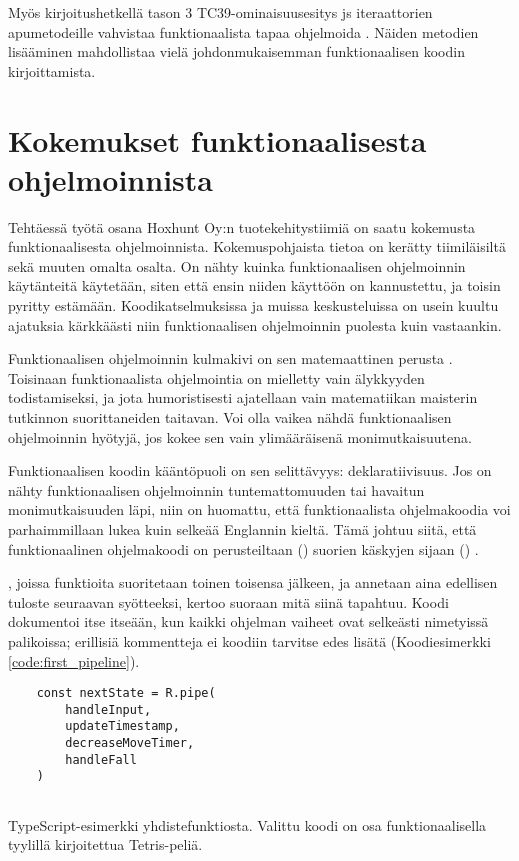 Myös kirjoitushetkellä tason 3 TC39-ominaisuusesitys \gls{js} iteraattorien apumetodeille vahvistaa funktionaalista tapaa ohjelmoida \cite{tc39_iterator_helpers}. Näiden metodien lisääminen mahdollistaa vielä johdonmukaisemman funktionaalisen koodin kirjoittamista.

\section{Kokemukset funktionaalisesta ohjelmoinnista}


Tehtäessä työtä osana Hoxhunt Oy:n tuotekehitystiimiä on saatu kokemusta funktionaalisesta ohjelmoinnista. Kokemuspohjaista tietoa on kerätty tiimiläisiltä sekä muuten omalta osalta. On nähty kuinka funktionaalisen ohjelmoinnin käytänteitä käytetään, siten että ensin niiden käyttöön on kannustettu, ja toisin pyritty estämään. Koodikatselmuksissa ja muissa keskusteluissa on usein kuultu ajatuksia kärkkäästi niin funktionaalisen ohjelmoinnin puolesta kuin vastaankin.

Funktionaalisen ohjelmoinnin kulmakivi on sen matemaattinen perusta \cite{computerphile_lambda,Tan2004}. Toisinaan funktionaalista ohjelmointia on mielletty vain älykkyyden todistamiseksi, ja jota humoristisesti ajatellaan vain matematiikan maisterin tutkinnon suorittaneiden taitavan. Voi olla vaikea nähdä funktionaalisen ohjelmoinnin hyötyjä, jos kokee sen vain ylimääräisenä monimutkaisuutena.

Funktionaalisen koodin kääntöpuoli on sen selittävyys: deklaratiivisuus. Jos on nähty funktionaalisen ohjelmoinnin tuntemattomuuden tai havaitun monimutkaisuuden läpi, niin on huomattu, että funktionaalista ohjelmakoodia voi parhaimmillaan lukea kuin selkeää Englannin kieltä. Tämä johtuu siitä, että funktionaalinen ohjelmakoodi on perusteiltaan () suorien käskyjen sijaan () \cite{ms:fp_vs_imperative}.

, joissa funktioita suoritetaan toinen toisensa jälkeen, ja annetaan aina edellisen tuloste seuraavan syötteeksi, kertoo suoraan mitä siinä tapahtuu. Koodi dokumentoi itse itseään, kun kaikki ohjelman vaiheet ovat selkeästi nimetyissä palikoissa; erillisiä kommentteja ei koodiin tarvitse edes lisätä  (Koodiesimerkki \ref{code:first_pipeline}).

\begin{code}
    \begin{verbatim}
    const nextState = R.pipe(
        handleInput,
        updateTimestamp,
        decreaseMoveTimer,
        handleFall
    )
    
\end{verbatim}
    \caption{TypeScript-esimerkki yhdistefunktiosta. Valittu koodi on osa funktionaalisella tyylillä kirjoitettua Tetris-peliä.}
    \label{code:first_pipeline}
\end{code}


